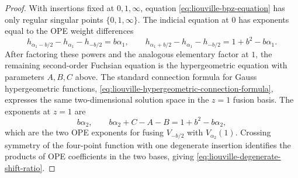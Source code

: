 \begin{proof}
With insertions fixed at \(0,1,\infty\), equation
\eqref{eq:liouville-bpz-equation} has only regular singular points
\(\{0,1,\infty\}\).  The indicial equation at \(0\) has exponents equal to
the OPE weight differences
\[
  h_{\alpha_1-b/2}-h_{\alpha_1}-h_{-b/2}=b\alpha_1,
  \qquad
  h_{\alpha_1+b/2}-h_{\alpha_1}-h_{-b/2}=1+b^2-b\alpha_1 .
\]
After factoring these powers and the analogous elementary factor at \(1\),
the remaining second-order Fuchsian equation is the hypergeometric equation
with parameters \(A,B,C\) above.  The standard connection formula for
Gauss hypergeometric functions,
\eqref{eq:liouville-hypergeometric-connection-formula}, expresses the same
two-dimensional solution space in the \(z=1\) fusion basis.  The exponents
at \(z=1\) are
\[
  b\alpha_2,
  \qquad
  b\alpha_2+C-A-B=1+b^2-b\alpha_2,
\]
which are the two OPE exponents for fusing \(V_{-b/2}\) with
\(V_{\alpha_2}(1)\).  Crossing symmetry of the four-point function with one
degenerate insertion identifies the products of OPE coefficients in the two
bases, giving
\eqref{eq:liouville-degenerate-shift-ratio}.


\end{proof}
